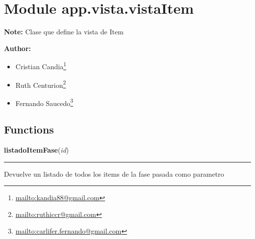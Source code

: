 %
%
%


\section{Module app.vista.vistaItem}

    \label{app:vista:vistaItem}
\textbf{Note:} Clase que define la vista de Item



\textbf{Author:} \begin{itemize}
\setlength{\parskip}{0.6ex}
  \item Cristian 
    Candia\footnote{\href{mailto:kandia88@gmail.com}{mailto:kandia88@gmail.com}}

  \item Ruth 
    Centurion\footnote{\href{mailto:ruthiccr@gmail.com}{mailto:ruthiccr@gmail.com}}

  \item Fernando 
    Saucedo\footnote{\href{mailto:carlifer.fernando@gmail.com}{mailto:carlifer.fernando@gmail.com}}

\end{itemize}





  \subsection{Functions}

    \label{app:vista:vistaItem:listadoItemFase}

    \vspace{0.5ex}

\hspace{.8\funcindent}\begin{boxedminipage}{\funcwidth}

    \raggedright \textbf{listadoItemFase}(\textit{id})

    \vspace{-1.5ex}

    \rule{\textwidth}{0.5\fboxrule}
\setlength{\parskip}{2ex}
    Devuelve un listado de todos los items de la fase pasada como parametro

\setlength{\parskip}{1ex}
    \end{boxedminipage}

